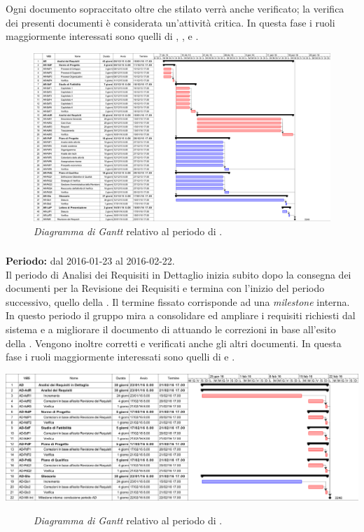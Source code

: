 Ogni documento sopraccitato oltre che stilato verrà anche verificato; la verifica dei presenti documenti è considerata un'attività critica.
In questa fase i ruoli maggiormente interessati sono quelli di \textit{\Amm}, \textit{\Res}, \textit{\Ana} e \textit{\Ver}. 
\begin{figure}
	\centering
	\includegraphics[keepaspectratio = true, width=23cm]{immagini/PdP_AnalisiDeiRequisitiGantt.png}
	\caption{\textit{Diagramma di Gantt} relativo al periodo di \AR.}\label{etichetta}
\end{figure}
\newpage

\subsubsection{\AD}
\textbf{Periodo:} dal 2016-01-23 al 2016-02-22. \\
Il periodo di Analisi dei Requisiti in Dettaglio inizia subito dopo la consegna dei documenti per la Revisione dei Requisiti e termina con l'inizio del periodo successivo, quello della \PA. Il termine fissato corrisponde ad una \textit{milestone} interna. \\
In questo periodo il gruppo mira a consolidare ed ampliare i requisiti richiesti dal sistema e a migliorare il documento di \textit{\AdR} attuando le correzioni in base all'esito della \RR.
Vengono inoltre corretti e verificati anche gli altri documenti. 
In questa fase i ruoli maggiormente interessati sono quelli di \textit{\Ana} e \textit{\Ver}.  
\begin{center}
	\includegraphics[keepaspectratio = true, width=16cm]{immagini/PdP_AnalisiDeiRequisitiInDettaglioGantt.png}
\end{center}
\begin{figure}[h]
	\caption{\textit{Diagramma di Gantt} relativo al periodo di \AD.}\label{etichetta}
\end{figure}

